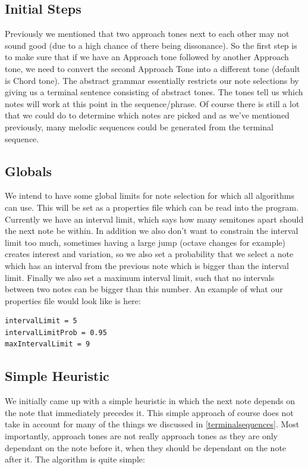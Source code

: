 \documentclass[pdftex,12pt,a4paper]{report}
\begin{document}
\subsection{Initial Steps}
Previously we mentioned that two approach tones next to each other may not sound good (due to a high chance of there being dissonance). So the first step is to make sure that if we have an Approach tone followed by another Approach tone, we need to convert the second Approach Tone into a different tone (default is Chord tone).
The abstract grammar essentially restricts our note selections by giving us a terminal sentence consisting of abstract tones. The tones tell us which notes will work at this point in the sequence/phrase. Of course there is still a lot that we could do to determine which notes are picked and as we've mentioned previously, many melodic sequences could be generated from the terminal sequence. 

\subsection{Globals}
We intend to have some global limits for note selection for which all algorithms can use. This will be set as a properties file which can be read into the program. Currently we have an interval limit, which says how many semitones apart should the next note be within. In addition we also don't want to constrain the interval limit too much, sometimes having a large jump (octave changes for example) creates interest and variation, so we also set a probability that we select a note which has an interval from the previous note which is bigger than the interval limit. Finally we also set a maximum interval limit, such that no intervals between two notes can be bigger than this number. An example of what our properties file would look like is here:

\begin{verbatim}
intervalLimit = 5
intervalLimitProb = 0.95
maxIntervalLimit = 9
\end{verbatim}

\subsection{Simple Heuristic}
We initially came up with a simple heuristic in which the next note depends on the note that immediately precedes it. This simple approach of course does not take in account for many of the things we discussed in \ref{terminalsequences}. Most importantly, approach tones are not really approach tones as they are only dependant on the note before it, when they should be dependant on the note after it.
The algorithm is quite simple:
\end{document}

